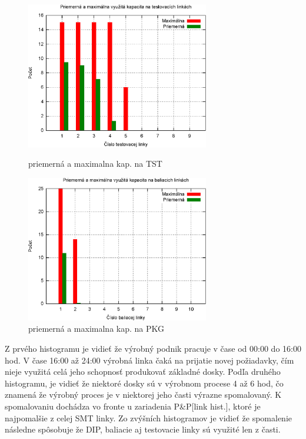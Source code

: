 \documentclass[12pt,a4paper,titlepage,final]{article}
\begin{document}
\begin{figure}[ht]
  \centering
  \begin{minipage}{0.45\linewidth}
  \centering
  \includegraphics[width=8cm]{doc/1_hist5.eps}
  \caption{priemerná a maximalna kap. na TST}
  \end{minipage}
  \quad
  \begin{minipage}{0.45\linewidth}
    \centering
    \includegraphics[width=8cm]{doc/1_hist6.eps}
    \caption{priemerná a maximalna kap. na PKG}
  \end{minipage}
\end{figure}

Z prvého histogramu je vidieť že výrobný podnik pracuje v čase od 00:00 do 16:00 hod.
V čase 16:00 až 24:00 výrobná linka čaká na prijatie novej požiadavky, čím nieje 
využitá celá jeho schopnosť produkovať základné dosky. Podľa druhého histogramu,
je vidieť že niektoré dosky sú v výrobnom procese 4 až 6 hod, čo znamená že výrobný
proces je v niektorej jeho časti výrazne spomalovaný. K spomalovaniu dochádza 
vo fronte u zariadenia P\&P[link hist.], ktoré je najpomalšie z celej SMT linky.
Zo zvýšních histogramov je vidieť že spomalenie následne spôsobuje že DIP, baliacie aj
testovacie linky sú využité len z časti.

\newpage
\end{document}
